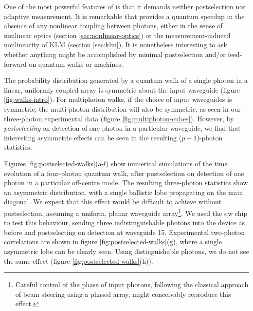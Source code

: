 One of the most powerful features of \bosonsampling is that it demands neither postselection nor adaptive measurement. It is remarkable that \bosonsampling provides a quantum speedup in the absence of any nonlinear coupling between photons, either in the sense of nonlinear optics (section \ref{sec:nonlinear-optics}) or the measurement-induced nonlinearity of KLM (section \ref{sec:klm}). It is nonetheless interesting to ask whether anything might be accomplished by minimal postselection and/or feed-forward on quantum walks or \bosonsampling machines.

The probability distribution generated by a quantum walk of a single photon in a linear, uniformly coupled array is symmetric about the input waveguide (figure \ref{fig:walks-intro}). For multiphoton walks, if the choice of input waveguides is symmetric, the multi-photon distribution will also be symmetric, as seen in our three-photon experimental data (figure \ref{fig:multiphoton-cubes}). However, by \emph{postselecting} on detection of one photon in a particular waveguide, we find that interesting asymmetric effects can be seen in the resulting ($p-1$)-photon statistics.

Figures \ref{fig:postselected-walks}(a-f) show numerical simulations of the time evolution of a four-photon quantum walk, after postselection on detection of one photon in a particular off-centre mode. The resulting three-photon statistics show an asymmetric distribution, with a single ballistic lobe propagating on the main diagonal. We expect that this effect would be difficult to achieve without postselection, assuming a uniform, planar waveguide array\footnote{Careful control of the phase of input photons, following the classical approach of beam steering using a phased array, might conceivably reproduce this effect.}. We used the \gls{qw} chip to test this behaviour, sending three indistinguishable photons into the device as before and postselecting on detection at waveguide 15. Experimental two-photon correlations are shown in figure \ref{fig:postselected-walks}(g), where a single asymmetric lobe can be clearly seen. Using distinguishable photons, we do not see the same effect (figure \ref{fig:postselected-walks}(h)).

\newcommand{\mudist}{\mathcal{M}}
